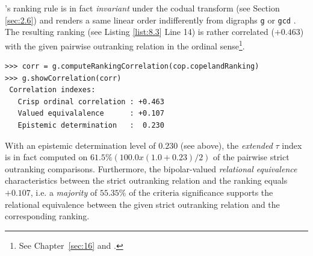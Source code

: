 \Copeland 's ranking rule is in fact \emph{invariant} under the codual transform (see Section \ref{sec:2.6}) and renders a same linear order indifferently from digraphs \texttt{g} or \texttt{gcd} . The resulting ranking (see Listing \ref{list:8.3} Line 14) is rather correlated ($+0.463$) with the given pairwise outranking relation in the ordinal \Kendall sense\footnote{See Chapter~\ref{sec:16} and \citet{BIS-2012a}.}.
\begin{lstlisting}[caption={Checking the quality of the \Copeland ranking},label=list:8.4]
>>> corr = g.computeRankingCorrelation(cop.copelandRanking)
>>> g.showCorrelation(corr)
 Correlation indexes:
   Crisp ordinal correlation : +0.463
   Valued equivalalence      : +0.107
   Epistemic determination   :  0.230
\end{lstlisting}
With an epistemic determination level of $0.230$ (see above), the \emph{extended} \Kendall $\tau$ index is in fact computed on $61.5\% (100.0 x (1.0 + 0.23)/2)$ of the pairwise strict outranking comparisons. Furthermore, the bipolar-valued \emph{relational equivalence} characteristics between the strict outranking relation and the \Copeland ranking equals $+0.107$, i.e. a \emph{majority} of $55.35\%$ of the criteria significance supports the relational equivalence between the given strict outranking relation and the corresponding \Copeland ranking.

